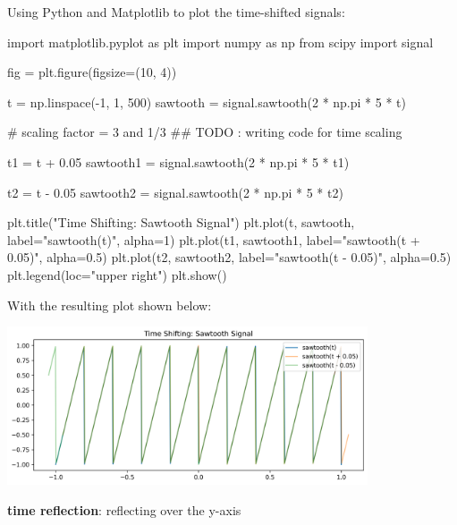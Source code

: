 \documentclass[a4paper, 10pt]{article}
\begin{document}
\begin{solution}
Using Python and Matplotlib to plot the time-shifted signals:
\begin{codingbox}
import matplotlib.pyplot as plt
import numpy as np
from scipy import signal

fig = plt.figure(figsize=(10, 4))

t = np.linspace(-1, 1, 500)
sawtooth = signal.sawtooth(2 * np.pi * 5 * t)

# scaling factor = 3 and 1/3
## TODO : writing code for time scaling

t1 = t + 0.05
sawtooth1 = signal.sawtooth(2 * np.pi * 5 * t1)

t2 = t - 0.05
sawtooth2 = signal.sawtooth(2 * np.pi * 5 * t2)

plt.title("Time Shifting: Sawtooth Signal")
plt.plot(t, sawtooth, label="sawtooth(t)", alpha=1)
plt.plot(t1, sawtooth1, label="sawtooth(t + 0.05)", alpha=0.5)
plt.plot(t2, sawtooth2, label="sawtooth(t - 0.05)", alpha=0.5)
plt.legend(loc="upper right")
plt.show()
\end{codingbox}

With the resulting plot shown below:
\begin{center}
    \includegraphics[width=0.8\textwidth]{images/problem_6_2.png}
\end{center}
\end{solution}

\newpage

\begin{subproblems}[start=3]
    \item \textbf{time reflection}: reflecting over the y-axis
\end{subproblems}
\end{document}
